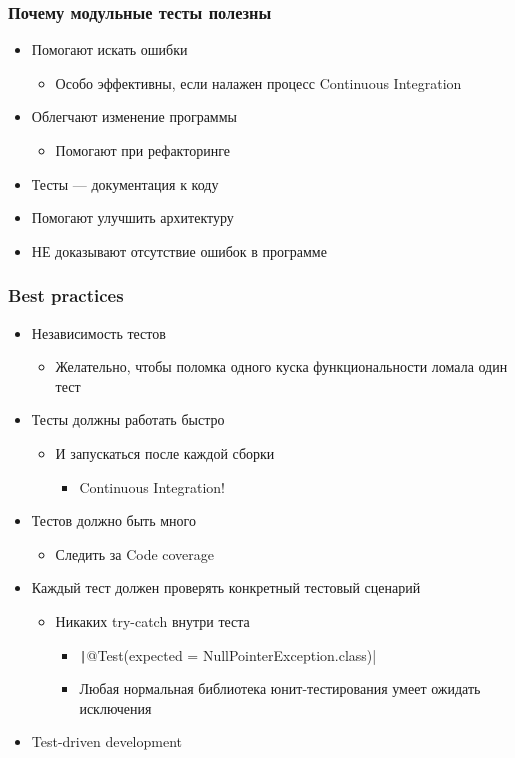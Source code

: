 \documentclass[xetex,mathserif,serif]{beamer}
\begin{document}
	\begin{frame}
		\frametitle{Почему модульные тесты полезны}
		\begin{itemize}
			\item Помогают искать ошибки
			\begin{itemize}
				\item Особо эффективны, если налажен процесс Continuous Integration
			\end{itemize}
			\item Облегчают изменение программы
			\begin{itemize}
				\item Помогают при рефакторинге
			\end{itemize}
			\item Тесты --- документация к коду
			\item Помогают улучшить архитектуру
			\item НЕ доказывают отсутствие ошибок в программе
		\end{itemize}
	\end{frame}

	\begin{frame}
		\frametitle{Best practices}
		\begin{itemize}
			\item Независимость тестов
			\begin{itemize}
				\item Желательно, чтобы поломка одного куска функциональности ломала один тест
			\end{itemize}
			\item Тесты должны работать быстро
			\begin{itemize}
				\item И запускаться после каждой сборки
				\begin{itemize}
					\item Continuous Integration!
				\end{itemize}
			\end{itemize}
			\item Тестов должно быть много
			\begin{itemize}
				\item Следить за Code coverage
			\end{itemize}
			\item Каждый тест должен проверять конкретный тестовый сценарий
			\begin{itemize}
				\item Никаких try-catch внутри теста
				\begin{itemize}
					\item \texttt|@Test(expected = NullPointerException.class)|
					\item Любая нормальная библиотека юнит-тестирования умеет ожидать исключения
				\end{itemize}
			\end{itemize}
			\item Test-driven development
		\end{itemize}
	\end{frame}
\end{document}
